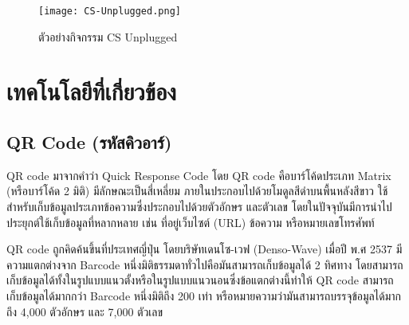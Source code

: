 \begin{figure}[ht]
    \centering
    \texttt{[image: CS-Unplugged.png]}
    \caption{ตัวอย่างกิจกรรม CS Unplugged}
    \label{fig:CS-Unplugged}
\end{figure}

\section{เทคโนโลยีที่เกี่ยวข้อง}
\subsection{QR Code (รหัสคิวอาร์) \cite{VarietyOfQRCode}}
QR code มาจากคำว่า Quick Response Code โดย QR code คือบาร์โค้ดประเภท Matrix (หรือบาร์โค้ด 2 มิติ) มีลักษณะเป็นสี่เหลี่ยม ภายในประกอบไปด้วยโมดูลสีดำบนพื้นหลังสีขาว ใช้สำหรับเก็บข้อมูลประเภทข้อความซึ่งประกอบไปด้วยตัวอักษร และตัวเลข โดยในปัจจุบันมีการนำไปประยุกต์ใช้เก็บข้อมูลที่หลากหลาย เช่น ที่อยู่เว็บไซต์ (URL) ข้อความ หรือหมายเลขโทรศัพท์ 

QR code ถูกคิดค้นขึ้นที่ประเทศญี่ปุ่น โดยบริษัทเดนโซ-เวฟ (Denso-Wave) เมื่อปี พ.ศ 2537 มีความแตกต่างจาก Barcode หนึ่งมิติธรรมดาทั่วไปคือมันสามารถเก็บข้อมูลได้ 2 ทิศทาง โดยสามารถเก็บข้อมูลได้ทั้งในรูปแบบแนวตั้งหรือในรูปแบบแนวนอนซึ่งข้อแตกต่างนี้ทำให้ QR code สามารถเก็บข้อมูลได้มากกว่า Barcode หนึ่งมิติถึง 200 เท่า หรือหมายความว่ามันสามารถบรรจุข้อมูลได้มากถึง 4,000 ตัวอักษร และ 7,000 ตัวเลข

